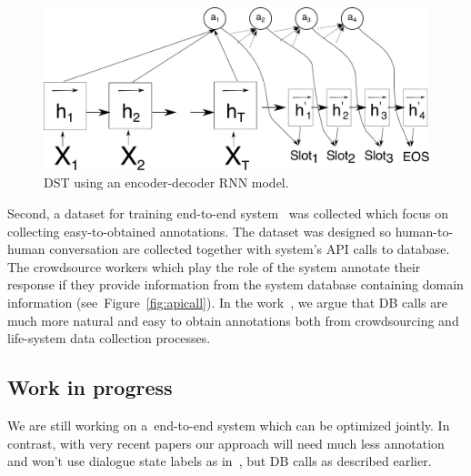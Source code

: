 \documentclass[11pt]{article}
\begin{document}
\begin{figure}[htpb]
    \centering
    \includegraphics[width=1.0\linewidth]{dst_seq2seq}
    \caption{DST using an encoder-decoder RNN model.}
    \label{fig:dst_seq2seq}
\end{figure}

Second, a dataset for training end-to-end system~\cite{platek2016wochat} was collected which focus on collecting easy-to-obtained annotations.
The dataset was designed so human-to-human conversation are collected together with system's API calls to database.
The crowdsource workers which play the role of the system annotate their response if they provide information from the system database containing domain information (see~Figure~\ref{fig:apicall}).
In the work~\cite{platek2016wochat}, we argue that DB calls are much more natural and easy to obtain annotations both from crowdsourcing and life-system data collection processes.

\subsection{Work in progress}

We are still working on a~end-to-end system which can be optimized jointly.
In contrast, with very recent papers our approach will need much less annotation and won't use dialogue state labels as in~\cite{wen_networkbased_2016}, but DB calls as described earlier.
\end{document}

